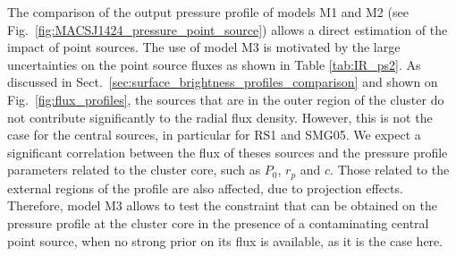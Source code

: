 \documentclass[twocolumn,traditabstract]{aa}
\begin{document}
The comparison of the output pressure profile of models M1 and M2 (see Fig.~\ref{fig:MACSJ1424_pressure_point_source}) allows a direct estimation of the impact of point sources. The use of model M3 is motivated by the large uncertainties on the point source fluxes as shown in Table \ref{tab:IR_ps2}. As discussed in Sect.~\ref{sec:surface_brightness_profiles_comparison} and shown on Fig.~\ref{fig:flux_profiles}, the sources that are in the outer region of the cluster do not contribute significantly to the radial flux density. However, this is not the case for the central sources, in particular for RS1 and SMG05. We expect a significant correlation between the flux of theses sources and the pressure profile parameters related to the cluster core, such as $P_0$, $r_p$ and $c$. Those related to the external regions of the profile are also affected, due to projection effects. Therefore, model M3 allows to test the constraint that can be obtained on the pressure profile at the cluster core in the presence of a contaminating central point source, when no strong prior on its flux is available, as it is the case here.
\end{document}
